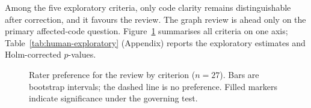 Among the five exploratory criteria, only code clarity remains distinguishable
after correction, and it favours the \baseline{} review. The graph review is
ahead only on the primary affected-code question.
Figure~\ref{fig:human-study} summarises all criteria on one axis;
Table~\ref{tab:human-exploratory} (Appendix) reports the exploratory
estimates and Holm-corrected $p$-values.

\begin{figure}[htbp]
    \centering
    
    \caption{Rater preference for the \kg{} review by criterion ($n = 27$).
             Bars are bootstrap intervals; the dashed line is no preference.
             Filled markers indicate significance under the governing test.}
    \label{fig:human-study}
\end{figure}
